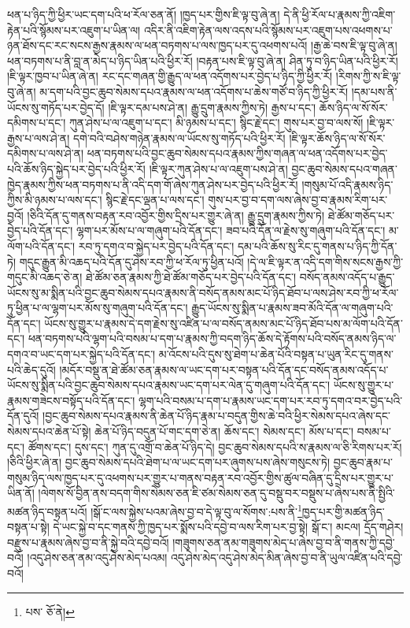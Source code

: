ཕན་པ་ཉིད་ཀྱི་ཕྱིར་ཡང་དག་པའི་ཕ་རོལ་ཅན་ནོ། །ཁྱད་པར་གྱིས་ཇི་ལྟ་བུ་ཞེ་ན། དེ་ནི་ཕྱི་རོལ་པ་རྣམས་ཀྱི་འཇིག་རྟེན་པའི་སྙོམས་པར་འཇུག་པ་ཡིན་ལ། འདིར་ནི་འཇིག་རྟེན་ལས་འདས་པའི་སྙོམས་པར་འཇུག་པས་འཕགས་པ་ཉན་ཐོས་དང་རང་སངས་རྒྱས་རྣམས་ལ་ཕན་བཏགས་པ་ལས་ཁྱད་པར་དུ་འཕགས་པའོ། །རྒྱ་ཆེ་བས་ཇི་ལྟ་བུ་ཞེ་ན། ཕན་བཏགས་པ་ནི་བླ་ན་མེད་པ་ཉིད་ཡིན་པའི་ཕྱིར་རོ། །བརྟན་པས་ཇི་ལྟ་བུ་ཞེ་ན། ཤིན་ཏུ་བ་ཉིད་ཡིན་པའི་ཕྱིར་རོ། །ཇི་ལྟར་ཁྱབ་པ་ཡིན་ཞེ་ན། རང་དང་གཞན་གྱི་རྒྱུད་ལ་ཕན་འདོགས་པར་བྱེད་པ་ཉིད་ཀྱི་ཕྱིར་རོ། །རིགས་ཀྱི་ས་ཇི་ལྟ་བུ་ཞེ་ན། མ་དག་པའི་བྱང་ཆུབ་སེམས་དཔའ་རྣམས་ལ་ཕན་འདོགས་པ་ཆེས་གཙོ་བ་ཉིད་ཀྱི་ཕྱིར་རོ། །དམ་པས་ནི་ཡོངས་སུ་གཏོད་པར་བྱེད་དོ། །ཇི་ལྟར་དམ་པས་ཤེ་ན། རྒྱུ་དྲུག་རྣམས་ཀྱིས་ཏེ། རྒྱས་པ་དང་། ཆོས་ཉིད་ལ་སོ་སོར་དམིགས་པ་དང་། ཀུན་ཤེས་པ་ལ་འཇུག་པ་དང་། མི་ཉམས་པ་དང་། སྙིང་རྗེ་དང་། གུས་པར་བྱ་བ་ལས་སོ། །ཇི་ལྟར་རྒྱས་པ་ལས་ཤེ་ན། དགེ་བའི་བཤེས་གཉེན་རྣམས་ལ་ཡོངས་སུ་གཏོད་པའི་ཕྱིར་རོ། །ཇི་ལྟར་ཆོས་ཉིད་ལ་སོ་སོར་དམིགས་པ་ལས་ཤེ་ན། ཕན་བཏགས་པའི་བྱང་ཆུབ་སེམས་དཔའ་རྣམས་ཀྱིས་གཞན་ལ་ཕན་འདོགས་པར་བྱེད་པའི་ཆོས་ཉིད་སྐྱེད་པར་བྱེད་པའི་ཕྱིར་རོ། །ཇི་ལྟར་ཀུན་ཤེས་པ་ལ་འཇུག་པས་ཤེ་ན། བྱང་ཆུབ་སེམས་དཔའ་གཞན་ཁྱེད་རྣམས་ཀྱིས་ཕན་བཏགས་པ་ནི་འདི་དག་གོ་ཞེས་ཀུན་ཤེས་པར་བྱེད་པའི་ཕྱིར་རོ། །གསུམ་པོ་འདི་རྣམས་ཉིད་ཀྱིས་མི་ཉམས་པ་ལས་དང་། སྙིང་རྗེ་དང་ལྡན་པ་ལས་དང་། གུས་པར་བྱ་བ་དག་ལས་ཞེས་བྱ་བ་རྣམས་རིག་པར་བྱའོ། །ཅིའི་དོན་དུ་གནས་བརྟན་རབ་འབྱོར་གྱིས་དྲིས་པར་གྱུར་ཞེ་ན། རྒྱུ་དྲུག་རྣམས་ཀྱིས་ཏེ། ཐེ་ཚོམ་གཅོད་པར་བྱེད་པའི་དོན་དང་། ལྷག་པར་མོས་པ་ལ་གཞུག་པའི་དོན་དང་། ཟབ་པའི་དོན་ལ་རྗེས་སུ་གཞུག་པའི་དོན་དང་། མ་ལོག་པའི་དོན་དང་། རབ་ཏུ་དགའ་བ་སྐྱེད་པར་བྱེད་པའི་དོན་དང་། དམ་པའི་ཆོས་སུ་རིང་དུ་གནས་པ་ཉིད་ཀྱི་དོན་ཏེ། གདུང་རྒྱུན་མི་འཆད་པའི་དོན་དུ་ཤེས་རབ་ཀྱི་ཕ་རོལ་ཏུ་ཕྱིན་པའོ། །དེ་ལ་ཇི་ལྟར་ན་འདི་དག་གིས་སངས་རྒྱས་ཀྱི་གདུང་མི་འཆད་ཅེ་ན། ཐེ་ཚོམ་ཅན་རྣམས་ཀྱི་ཐེ་ཚོམ་གཅོད་པར་བྱེད་པའི་དོན་དང་། བསོད་ནམས་འདོད་པ་རྒྱུད་ཡོངས་སུ་མ་སྨིན་པའི་བྱང་ཆུབ་སེམས་དཔའ་རྣམས་ནི་བསོད་ནམས་མང་པོ་ཉིད་ཐོབ་པ་ལས་ཤེས་རབ་ཀྱི་ཕ་རོལ་ཏུ་ཕྱིན་པ་ལ་ལྷག་པར་མོས་སུ་གཞུག་པའི་དོན་དང་། རྒྱུད་ཡོངས་སུ་སྨིན་པ་རྣམས་ཟབ་མོའི་དོན་ལ་གཞུག་པའི་དོན་དང་། ཡོངས་སུ་གྱུར་པ་རྣམས་དེ་དག་རྗེས་སུ་འཛིན་པ་ལ་བསོད་ནམས་མང་པོ་ཉིད་ཐོབ་པས་མ་ལོག་པའི་དོན་དང་། ཕན་བཏགས་པའི་ལྷག་པའི་བསམ་པ་དག་པ་རྣམས་ཀྱི་བདག་ཉིད་ཆོས་དེ་རྟོགས་པའི་བསོད་ནམས་ཉིད་ལ་དགའ་བ་ཡང་དག་པར་སྐྱེད་པའི་དོན་དང་། མ་འོངས་པའི་དུས་སུ་ཐེག་པ་ཆེན་པོའི་བསྟན་པ་ཡུན་རིང་དུ་གནས་པའི་ཆེད་དུའོ། །མདོར་བསྡུ་ན་ཐེ་ཚོམ་ཅན་རྣམས་ལ་ཡང་དག་པར་བསྟན་པའི་དོན་དང་བསོད་ནམས་འདོད་པ་ཡོངས་སུ་སྨིན་པའི་བྱང་ཆུབ་སེམས་དཔའ་རྣམས་ཡང་དག་པར་ལེན་དུ་གཞུག་པའི་དོན་དང་། ཡོངས་སུ་གྱུར་པ་རྣམས་གཟེངས་བསྟོད་པའི་དོན་དང་། ལྷག་པའི་བསམ་པ་དག་པ་རྣམས་ཡང་དག་པར་རབ་ཏུ་དགའ་བར་བྱེད་པའི་དོན་དུའོ། །བྱང་ཆུབ་སེམས་དཔའ་རྣམས་ནི་ཆེན་པོ་ཉིད་རྣམ་པ་བདུན་གྱིས་ཆེ་བའི་ཕྱིར་སེམས་དཔའ་ཞེས་དང་སེམས་དཔའ་ཆེན་པོ་སྟེ། ཆེན་པོ་ཉིད་བདུན་པོ་གང་དག་ཅེ་ན། ཆོས་དང་། སེམས་དང་། མོས་པ་དང་། བསམ་པ་དང་། ཚོགས་དང་། དུས་དང་། ཀུན་དུ་འགྲོ་བ་ཆེན་པོ་ཉིད་དེ། བྱང་ཆུབ་སེམས་དཔའི་ས་རྣམས་ལ་ཅི་རིགས་པར་རོ། །ཅིའི་ཕྱིར་ཞེ་ན། བྱང་ཆུབ་སེམས་དཔའི་ཐེག་པ་ལ་ཡང་དག་པར་ཞུགས་པས་ཞེས་གསུངས་ཏེ། བྱང་ཆུབ་རྣམ་པ་གསུམ་ཉིད་ལས་ཁྱད་པར་དུ་འཕགས་པར་གྱུར་པ་གནས་བརྟན་རབ་འབྱོར་གྱིས་ཚུལ་བཞིན་དུ་དྲིས་པར་གྱུར་པ་ཡིན་ནོ། །ལེགས་སོ་བྱིན་ནས་བདག་གིས་སེམས་ཅན་ཇི་ཙམ་སེམས་ཅན་དུ་བསྡུ་བར་བསྡུས་པ་ཞེས་པས་ནི་སྤྱིའི་མཚན་ཉིད་བསྟན་པའོ། །སྒོ་ང་ལས་སྐྱེས་པའམ་ཞེས་བྱ་བ་དེ་ལྟ་བུ་ལ་སོགས་:པས་ནི་\footnote{པས་  ཅོ་ནེ། }ཁྱད་པར་གྱི་མཚན་ཉིད་བསྟན་པ་སྟེ། དེ་ཡང་སྐྱེ་བ་དང་གནས་ཀྱི་ཁྱད་པར་སྨོས་པའི་དབྱེ་བ་ལས་རིག་པར་བྱ་སྟེ། སྒོ་ང་། མངལ། དྲོད་གཤེར། བརྫུས་པ་རྣམས་ཞེས་བྱ་བ་ནི་སྐྱེ་བའི་དབྱེ་བའོ། །གཟུགས་ཅན་ནམ་གཟུགས་མེད་པ་ཞེས་བྱ་བ་ནི་གནས་ཀྱི་དབྱེ་བའོ། །འདུ་ཤེས་ཅན་ནམ་འདུ་ཤེས་མེད་པའམ། འདུ་ཤེས་མེད་འདུ་ཤེས་མེད་མིན་ཞེས་བྱ་བ་ནི་ཡུལ་འཛིན་པའི་དབྱེ་བའོ། 